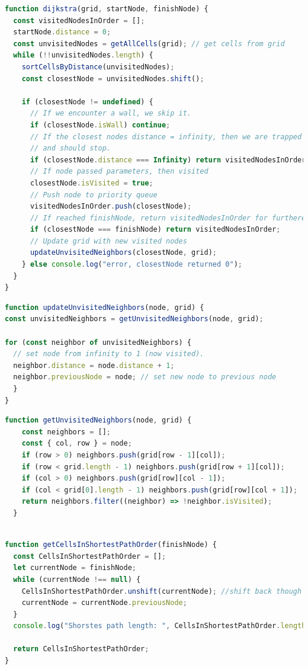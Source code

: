 \documentclass[12pt]{article}
\begin{document}
\begin{lstlisting}[language=JavaScript, caption=Kode for Dijkstra's Algoritme]
function dijkstra(grid, startNode, finishNode) {
  const visitedNodesInOrder = [];
  startNode.distance = 0;
  const unvisitedNodes = getAllCells(grid); // get cells from grid
  while (!!unvisitedNodes.length) {
    sortCellsByDistance(unvisitedNodes);
    const closestNode = unvisitedNodes.shift();

    if (closestNode != undefined) {
      // If we encounter a wall, we skip it.
      if (closestNode.isWall) continue;
      // If the closest nodes distance = infinity, then we are trapped 
      // and should stop.
      if (closestNode.distance === Infinity) return visitedNodesInOrder;
      // If node passed parameters, then visited
      closestNode.isVisited = true; 
      // Push node to priority queue
      visitedNodesInOrder.push(closestNode);
      // If reached finishNode, return visitedNodesInOrder for furthere use.
      if (closestNode === finishNode) return visitedNodesInOrder;
      // Update grid with new visited nodes
      updateUnvisitedNeighbors(closestNode, grid); 
    } else console.log("error, closestNode returned 0");
  }
}
\end{lstlisting}
\begin{lstlisting}[language=JavaScript, caption=Kode for opdatering af unvisitedNodes]
function updateUnvisitedNeighbors(node, grid) {
const unvisitedNeighbors = getUnvisitedNeighbors(node, grid);

for (const neighbor of unvisitedNeighbors) {
  // set node from infinity to 1 (now visited).
  neighbor.distance = node.distance + 1;
  neighbor.previousNode = node; // set new node to previous node
  }
}
\end{lstlisting}
\begin{lstlisting}[language=JavaScript, caption=Kode for at søge nye nodes]
  function getUnvisitedNeighbors(node, grid) {
    const neighbors = [];
    const { col, row } = node;
    if (row > 0) neighbors.push(grid[row - 1][col]);
    if (row < grid.length - 1) neighbors.push(grid[row + 1][col]);
    if (col > 0) neighbors.push(grid[row][col - 1]);
    if (col < grid[0].length - 1) neighbors.push(grid[row][col + 1]);
    return neighbors.filter((neighbor) => !neighbor.isVisited);
  }
  
\end{lstlisting}
\begin{lstlisting}[language=JavaScript, caption=Kode for finde korteste vej]
  function getCellsInShortestPathOrder(finishNode) {
  const CellsInShortestPathOrder = [];
  let currentNode = finishNode;
  while (currentNode !== null) {
    CellsInShortestPathOrder.unshift(currentNode); //shift back though finishNode
    currentNode = currentNode.previousNode;
  }
  console.log("Shorstes path length: ", CellsInShortestPathOrder.length);

  return CellsInShortestPathOrder;
}
\end{lstlisting}
\end{document}
